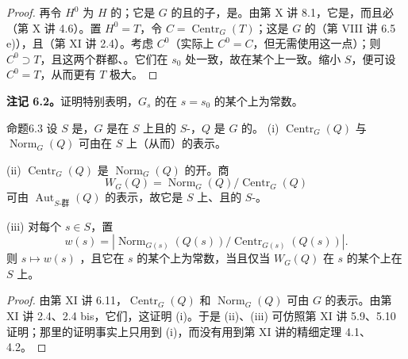 \begin{proof}
再令 $H^0$ 为 $H$ 的；它是 $G$ 的且的子，是。由第 X 讲 8.1，它是，而且必（第 X 讲 4.6）。置 $H^0=T$，令 $C=\operatorname{Centr}_G(T)$；这是 $G$ 的（第 VIII 讲 6.5 e)），且（第 XI 讲 2.4）。考虑 $C^0$（实际上 $C^0=C$，但无需使用这一点）；则 $C^0\supset T$，且这两个群都、。它们在 $s_0$ 处一致，故在某个上一致。缩小 $S$，便可设 $C^0=T$，从而更有 $T$ 极大。
\end{proof}
\textbf{注记 6.2。}证明特别表明，$G_s$ 的在 $s=s_0$ 的某个上为常数。
\begin{SGAresult}{命题}{6.3}
设 $S$ 是，$G$ 是在 $S$ 上且的 $S$-，$Q$ 是 $G$ 的。
(i) $\operatorname{Centr}_G(Q)$ 与 $\operatorname{Norm}_G(Q)$ 可由在 $S$ 上（从而）的表示。

(ii) $\operatorname{Centr}_G(Q)$ 是 $\operatorname{Norm}_G(Q)$ 的开。商
\[
W_G(Q)=\operatorname{Norm}_G(Q)/\operatorname{Centr}_G(Q)
\]
可由 $\operatorname{Aut}_{S\text{-群}}(Q)$ 的表示，故它是 $S$ 上、且的 $S$-。

(iii) 对每个 $s\in S$，置
\[
w(s)=\left|\operatorname{Norm}_{G(s)}(Q(s))/\operatorname{Centr}_{G(s)}(Q(s))\right|.
\]
则 $s\mapsto w(s)$ ，且它在 $s$ 的某个上为常数，当且仅当 $W_G(Q)$ 在 $s$ 的某个上在 $S$ 上。
\end{SGAresult}
\begin{proof}
由第 XI 讲 6.11，$\operatorname{Centr}_G(Q)$ 和 $\operatorname{Norm}_G(Q)$ 可由 $G$ 的表示。由第 XI 讲 2.4、2.4 bis，它们，这证明 (i)。于是 (ii)、(iii) 可仿照第 XI 讲 5.9、5.10 证明；那里的证明事实上只用到 (i)，而没有用到第 XI 讲的精细定理 4.1、4.2。
\end{proof}
